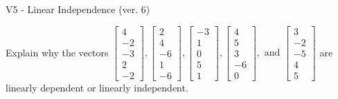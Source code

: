 \begin{exercise}
  \begin{exerciseTitle}V5 - Linear Independence (ver. 6)\end{exerciseTitle}
  \begin{exerciseStatement}
    Explain why the vectors \(\left[\begin{array}{r}
4 \\
-2 \\
-3 \\
2 \\
-2
\end{array}\right] , \left[\begin{array}{r}
2 \\
4 \\
-6 \\
1 \\
-6
\end{array}\right] , \left[\begin{array}{r}
-3 \\
1 \\
0 \\
5 \\
1
\end{array}\right] , \left[\begin{array}{r}
4 \\
5 \\
3 \\
-6 \\
0
\end{array}\right] , \text{ and } \left[\begin{array}{r}
3 \\
-2 \\
-5 \\
4 \\
5
\end{array}\right]\) are linearly dependent or linearly independent.	



\end{exerciseStatement}
\end{exercise}
